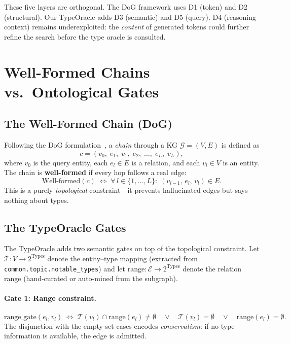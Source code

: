 \documentclass[11pt,a4paper]{article}
\newcommand{\G}{\mathcal{G}}
\newcommand{\T}{\mathcal{T}}
\newcommand{\E}{\mathcal{E}}
\newcommand{\Types}{\mathrm{Types}}
\newcommand{\range}{\mathrm{range}}
\begin{document}
These five layers are orthogonal.  The DoG framework uses D1 (token)
and D2 (structural).  Our TypeOracle adds D3 (semantic) and D5 (query).
D4 (reasoning context) remains underexploited: the \emph{content} of
generated tokens could further refine the search before the type oracle
is consulted.

\section{Well-Formed Chains vs.\ Ontological Gates}

\subsection{The Well-Formed Chain (DoG)}

Following the DoG formulation~\cite{dog2025}, a \emph{chain} through
a KG $\G = (V, E)$ is defined as
\[
  c = (v_0,\; e_1,\; v_1,\; e_2,\; \ldots,\; e_L,\; v_L),
\]
where $v_0$ is the query entity, each $e_l \in E$ is a relation, and
each $v_l \in V$ is an entity.  The chain is \textbf{well-formed} if
every hop follows a real edge:
\[
  \text{Well-formed}(c)
  \;\iff\;
  \forall\, l \in \{1,\ldots,L\}:\;
  (v_{l-1},\, e_l,\, v_l) \in E.
\]
This is a purely \emph{topological} constraint---it prevents
hallucinated edges but says nothing about types.

\subsection{The TypeOracle Gates}

The TypeOracle adds two semantic gates on top of the topological
constraint.  Let $\T: V \to 2^{\Types}$ denote the entity--type mapping
(extracted from \texttt{common.topic.notable\_types}) and let
$\range: \E \to 2^{\Types}$ denote the relation range (hand-curated or
auto-mined from the subgraph).

\paragraph{Gate 1: Range constraint.}
\[
  \text{range\_gate}(e_l, v_l)
  \;\iff\;
  \T(v_l) \cap \range(e_l) \neq \emptyset
  \quad\lor\quad
  \T(v_l) = \emptyset
  \quad\lor\quad
  \range(e_l) = \emptyset.
\]
The disjunction with the empty-set cases encodes \emph{conservatism}:
if no type information is available, the edge is admitted.
\end{document}
